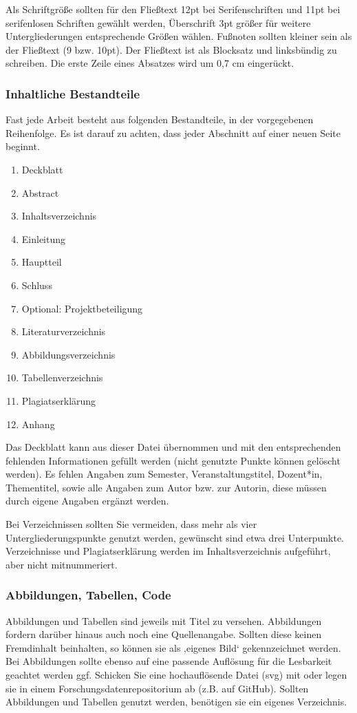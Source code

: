Als Schriftgröße sollten für den Fließtext 12pt bei Serifenschriften und 11pt bei serifenlosen Schriften gewählt werden, Überschrift 3pt größer für weitere Untergliederungen entsprechende Größen wählen. Fußnoten sollten kleiner sein als der Fließtext (9 bzw. 10pt). Der Fließtext ist als Blocksatz und linksbündig zu schreiben. Die erste Zeile eines Absatzes wird um 0,7 cm eingerückt.
\subsubsection{Inhaltliche Bestandteile}
Fast jede Arbeit besteht aus folgenden Bestandteile, in der vorgegebenen Reihenfolge. Es ist darauf zu achten, dass jeder Abschnitt auf einer neuen Seite beginnt.
\begin{enumerate}
    \item Deckblatt
    \item Abstract
    \item Inhaltsverzeichnis
    \item Einleitung
    \item Hauptteil
    \item Schluss
    \item Optional: Projektbeteiligung
    \item Literaturverzeichnis
    \item Abbildungsverzeichnis
    \item Tabellenverzeichnis
    \item Plagiatserklärung
    \item Anhang
\end{enumerate}
Das Deckblatt kann aus dieser Datei übernommen und mit den entsprechenden fehlenden Informationen gefüllt werden (nicht genutzte Punkte können gelöscht werden). Es fehlen Angaben zum Semester, Veranstaltungstitel, Dozent*in, Thementitel, sowie alle Angaben zum Autor bzw. zur Autorin, diese müssen durch eigene Angaben ergänzt werden. 

Bei Verzeichnissen sollten Sie vermeiden, dass mehr als vier Untergliederungspunkte genutzt werden, gewünscht sind etwa drei Unterpunkte. Verzeichnisse und Plagiatserklärung werden im Inhaltsverzeichnis aufgeführt, aber nicht mitnummeriert.

\subsubsection{Abbildungen, Tabellen, Code}
Abbildungen und Tabellen sind jeweils mit Titel zu versehen. Abbildungen fordern darüber hinaus auch noch eine Quellenangabe. Sollten diese keinen Fremdinhalt beinhalten, so können sie als ‚eigenes Bild‘ gekennzeichnet werden. Bei Abbildungen sollte ebenso auf eine passende Auflösung für die Lesbarkeit geachtet werden ggf. Schicken Sie eine hochauflösende Datei (svg) mit oder legen sie in einem Forschungsdatenrepositorium ab (z.B. auf GitHub). Sollten Abbildungen und Tabellen genutzt werden, benötigen sie ein eigenes Verzeichnis.

